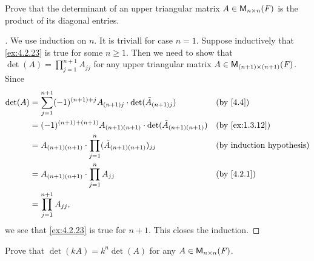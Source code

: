 \exercisesection

\setcounter{ex}{22}
\begin{ex}\label{ex:4.2.23}
	Prove that the determinant of an upper triangular matrix \(A \in \ms[n][n][\F]\) is the product of its diagonal entries.
\end{ex}

\begin{proof}[]
	We use induction on \(n\).
	It is triviall for case \(n = 1\).
	Suppose inductively that \cref{ex:4.2.23} is true for some \(n \geq 1\).
	Then we need to show that \(\det(A) = \prod_{j = 1}^{n + 1} A_{j j}\) for any upper triangular matrix \(A \in \ms[(n + 1)][(n + 1)][\F]\).
	Since
	\begin{align*}
		\det(A) & = \sum_{j = 1}^{n + 1} (-1)^{(n + 1) + j} A_{(n + 1) j} \cdot \det(\tilde{A}_{(n + 1) j}) &  & \by{4.4}                         \\
		        & = (-1)^{(n + 1) + (n + 1)} A_{(n + 1) (n + 1)} \cdot \det(\tilde{A}_{(n + 1) (n + 1)})    &  & \by{ex:1.3.12}                   \\
		        & = A_{(n + 1) (n + 1)} \cdot \prod_{j = 1}^n (\tilde{A}_{(n + 1) (n + 1)})_{j j}           &  & \text{(by induction hypothesis)} \\
		        & = A_{(n + 1) (n + 1)} \cdot \prod_{j = 1}^n A_{j j}                                       &  & \by{4.2.1}                       \\
		        & = \prod_{j = 1}^{n + 1} A_{j j},
	\end{align*}
	we see that \cref{ex:4.2.23} is true for \(n + 1\).
	This closes the induction.
\end{proof}

\setcounter{ex}{24}
\begin{ex}\label{ex:4.2.25}
	Prove that \(\det(kA) = k^n \det(A)\) for any \(A \in \ms[n][n][\F]\).
\end{ex}

